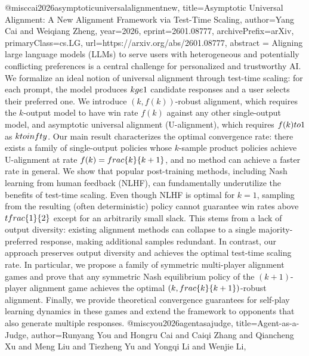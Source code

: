 {}@misc{cai2026asymptoticuniversalalignmentnew,
      title={Asymptotic Universal Alignment: A New Alignment Framework via Test-Time Scaling}, 
      author={Yang Cai and Weiqiang Zheng},
      year={2026},
      eprint={2601.08777},
      archivePrefix={arXiv},
      primaryClass={cs.LG},
      url={https://arxiv.org/abs/2601.08777},
      abstract = {Aligning large language models (LLMs) to serve users with heterogeneous and potentially conflicting preferences is a central challenge for personalized and trustworthy AI. We formalize an ideal notion of universal alignment through test-time scaling: for each prompt, the model produces $k\\ge 1$ candidate responses and a user selects their preferred one. We introduce $(k,f(k))$-robust alignment, which requires the $k$-output model to have win rate $f(k)$ against any other single-output model, and asymptotic universal alignment (U-alignment), which requires $f(k)\\to 1$ as $k\\to\\infty$. Our main result characterizes the optimal convergence rate: there exists a family of single-output policies whose $k$-sample product policies achieve U-alignment at rate $f(k)=\\frac\{k\}\{k+1\}$, and no method can achieve a faster rate in general.   We show that popular post-training methods, including Nash learning from human feedback (NLHF), can fundamentally underutilize the benefits of test-time scaling. Even though NLHF is optimal for $k=1$, sampling from the resulting (often deterministic) policy cannot guarantee win rates above $\\tfrac\{1\}\{2\}$ except for an arbitrarily small slack. This stems from a lack of output diversity: existing alignment methods can collapse to a single majority-preferred response, making additional samples redundant. In contrast, our approach preserves output diversity and achieves the optimal test-time scaling rate. In particular, we propose a family of symmetric multi-player alignment games and prove that any symmetric Nash equilibrium policy of the $(k+1)$-player alignment game achieves the optimal $(k,\\frac\{k\}\{k+1\})$-robust alignment. Finally, we provide theoretical convergence guarantees for self-play learning dynamics in these games and extend the framework to opponents that also generate multiple responses.}
}@misc{you2026agentasajudge,
      title={Agent-as-a-Judge}, 
      author={Runyang You and Hongru Cai and Caiqi Zhang and Qiancheng Xu and Meng Liu and Tiezheng Yu and Yongqi Li and Wenjie Li},
}
